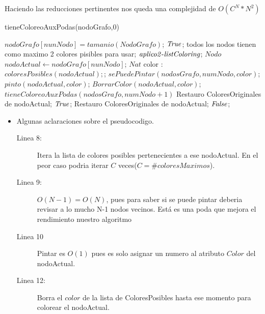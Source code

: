 Haciendo las reducciones pertinentes nos queda una complejidad de $O(C^{N}*N^{2})$

\begin{codebox}
	\li \Return  tieneColoreoAuxPodas(nodoGrafo,0)%
\end{codebox}


\begin{codebox}
	\li {}
	\li \If $nodoGrafo  [ nunNodo ] = tamanio(NodoGrafo)$; 
	\li		\Then \Return $\id{True}$; 
		\End   
	\li {} 
	\li \If todos los nodos tienen como maximo 2 colores pisibles para usar; 
	\li 	\Then \Return $\id{aplico 2-list Coloring}$;  
		\End
	\li $Nodo$ $nodoActual \leftarrow nodoGrafo [ nunNodo ]$;
	\li	\For $Nat$ color $:$ \To $ coloresPosibles(nodoActual); $;  \Do 
	\li		\If $sePuedePintar(nodosGrafo, numNodo, color)$; 
	\li			\Then $ pinto(nodoActual, color)$;	
	\li				  $ BorrarColor(nodoActual, color)$; 
	\li 		{}
	\li			\If $ tieneColoreoAuxPodas(nodosGrafo, numNodo+1)$ 
	\li				\Then Restauro ColoresOriginales de nodoActual; 		
	\li					\Return $\id{True}$;
				\End
			\End
		\End
	\li {}	
	\li Restauro ColoresOriginales de nodoActual;
	\li \Return $\id{False}$;	
\end{codebox}

\begin{itemize}
    \item Algunas aclaraciones sobre el pseudocodigo.
		\begin{description}
			\item[Linea 8:] Itera la lista de colores posibles pertenecientes a ese nodoActual. En el peor caso podria iterar $C$ veces($C=\#coloresMaximos$). 
			\item[Linea 9:] $O(N-1) = O(N)$, pues para saber si se puede pintar deberia revisar a lo mucho N-1 nodos vecinos. Está es una poda que mejora el rendimiento nuestro algoritmo
			\item[Linea 10] Pintar es $O(1)$ pues es solo asignar un numero al atributo $Color$ del nodoActual.
			\item[Linea 12:] Borra el $color$ de la lista de ColoresPosibles hasta ese momento para colorear el nodoActual.
		\end{description}
\end{itemize}

